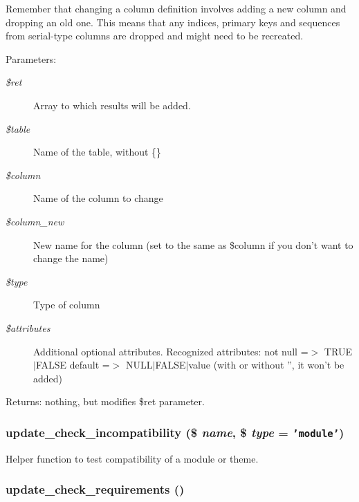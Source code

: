 Remember that changing a column definition involves adding a new column and dropping an old one. This means that any indices, primary keys and sequences from serial-type columns are dropped and might need to be recreated.

\begin{Desc}
\item[Parameters:]
\begin{description}
\item[{\em \$ret}]Array to which results will be added. \item[{\em \$table}]Name of the table, without \{\} \item[{\em \$column}]Name of the column to change \item[{\em \$column\_\-new}]New name for the column (set to the same as \$column if you don't want to change the name) \item[{\em \$type}]Type of column \item[{\em \$attributes}]Additional optional attributes. Recognized attributes: not null =$>$ TRUE$|$FALSE default =$>$ NULL$|$FALSE$|$value (with or without '', it won't be added) \end{description}
\end{Desc}
\begin{Desc}
\item[Returns:]nothing, but modifies \$ret parameter. \end{Desc}
\hypertarget{update_8php_39592132a77fd791c44a8d6faf362cb0}{
\subsubsection[{update\_\-check\_\-incompatibility}]{\setlength{\rightskip}{0pt plus 5cm}update\_\-check\_\-incompatibility (\$ {\em name}, \/  \$ {\em type} = {\tt 'module'})}}
\label{update_8php_39592132a77fd791c44a8d6faf362cb0}


Helper function to test compatibility of a module or theme. \hypertarget{update_8php_d0b8cf7510033800502402c275add53b}{
\subsubsection[{update\_\-check\_\-requirements}]{\setlength{\rightskip}{0pt plus 5cm}update\_\-check\_\-requirements ()}}
\label{update_8php_d0b8cf7510033800502402c275add53b}


